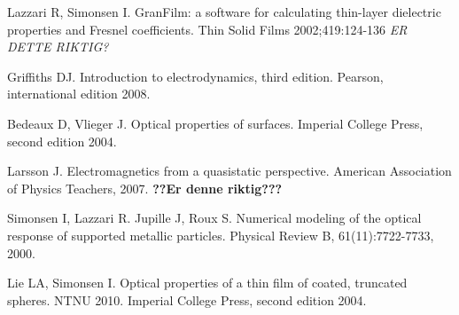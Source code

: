 \begin{thebibliography}{9}

      Lazzari R, Simonsen I. 
      GranFilm: a software for calculating thin-layer 
      dielectric properties and Fresnel coefficients.
      Thin Solid Films 
      2002;419:124-136
      \textit{ER DETTE RIKTIG?}

      Griffiths DJ.
      Introduction to electrodynamics, third edition.
      Pearson, international edition 2008.
      
      Bedeaux D, Vlieger J. 
      Optical properties of surfaces. 
      Imperial College Press, second edition 2004.

      Larsson J.
      Electromagnetics from a quasistatic perspective.
      American Association of Physics Teachers, 2007.
      \textbf{??Er denne riktig???}

      Simonsen I, Lazzari R. Jupille J, Roux S.
      Numerical modeling of the optical response of supported metallic particles.
      Physical Review B, 61(11):7722-7733, 2000.


      Lie LA, Simonsen I.
      Optical properties of a thin film of coated, truncated spheres.
      NTNU 2010.
      Imperial College Press, second edition 2004.
\end{thebibliography}

